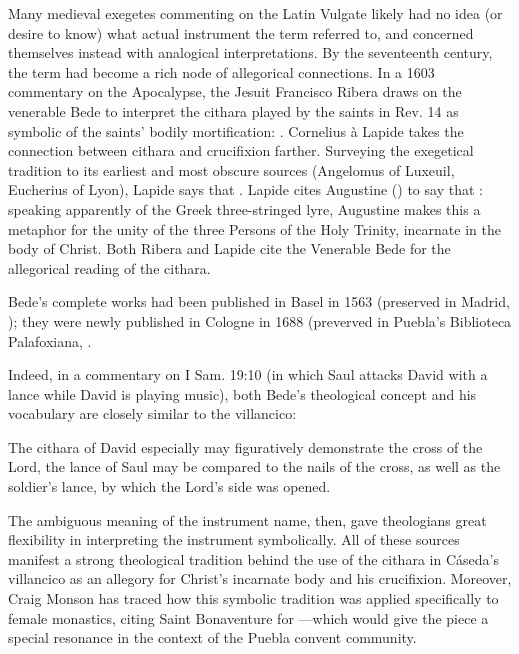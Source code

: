 Many medieval exegetes commenting on the Latin Vulgate likely had no idea (or
desire to know) what actual instrument the term  referred to, and
concerned themselves instead with analogical interpretations.
By the seventeenth century, the term had become a rich node of allegorical
connections.
In a 1603 commentary on the Apocalypse, the Jesuit Francisco Ribera draws on
the venerable Bede to interpret the cithara played by the saints in Rev. 14 as
symbolic of the saints' bodily mortification: .%
    \Autocite[429]{Ribera:Apocalypse}
Cornelius à Lapide takes the connection between cithara and crucifixion
farther.  
Surveying the exegetical tradition to its earliest and most obscure sources
(Angelomus of Luxeuil, Eucherius of Lyon), Lapide says that
.%
    \Autocite[370]{Lapide:1Samuel}
Lapide cites Augustine () to say that : speaking apparently of the Greek
three-stringed lyre, Augustine makes this a metaphor for the unity of the three
Persons of the Holy Trinity, incarnate in the body of Christ.%
    \Autocite[370]{Lapide:1Samuel}
Both Ribera and Lapide cite the Venerable Bede for the allegorical reading of
the cithara.%
\begin{Footnote}
    Bede's complete works had been published in Basel in 1563 (preserved in
    Madrid, ); they were newly published in Cologne in 1688
    (preverved in Puebla's Biblioteca Palafoxiana, .
\end{Footnote}
Indeed, in a commentary on I Sam. 19:10 (in which Saul attacks David with a
lance while David is playing music), both Bede's theological concept and his
vocabulary are closely similar to the villancico: 
\begin{quoting} 
    The cithara  of David especially may figuratively
    demonstrate the cross of the Lord, the lance  of Saul may
    be compared to the nails  of the cross, as well as the
    soldier's lance, by which the Lord's side was opened.%
        \Autocite[123]{Bede:Commentaries2}
\end{quoting}

The ambiguous meaning of the instrument name, then, gave theologians great
flexibility in interpreting the instrument symbolically.
All of these sources manifest a strong theological tradition behind the use of
the cithara in Cáseda's villancico as an allegory for Christ's incarnate body
and his crucifixion.  
Moreover, Craig Monson has traced how this symbolic tradition was applied
specifically to female monastics, citing Saint Bonaventure for ---which would give the piece a special resonance in the
context of the Puebla convent community.%
    \Autocite[93--94]{Monson:DivasConvent}


